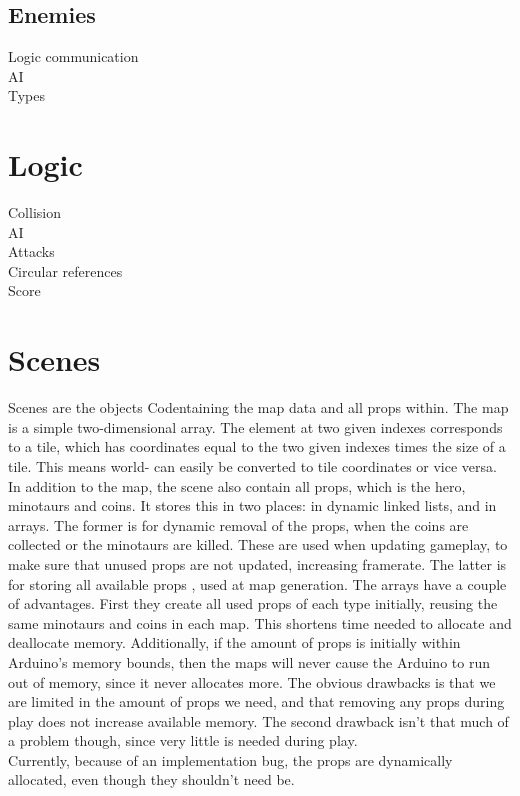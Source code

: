 \subsection{Enemies} Logic communication\\ AI\\ Types

\section{Logic} Collision\\ AI\\ Attacks\\ Circular references\\ Score

\section{Scenes} %
Scenes are the objects Codentaining the map data and
all props within. The map is a simple two-dimensional array. The element at two
given indexes corresponds to a tile, which has coordinates equal to the two
given indexes times the size of a tile. This means world- can easily be
converted to tile coordinates or vice versa.\\ In addition to the map, the
scene also contain all props, which is the hero, minotaurs and coins. It stores
this in two places: in dynamic linked lists, and in arrays. The former is for
dynamic removal of the props, when the coins are collected or the minotaurs are
killed. These are used when updating gameplay, to make sure that unused props
are not updated, increasing framerate. The latter is for storing all available
props , used at map generation. The arrays have a couple of advantages. First
they create all used props of each type initially, reusing the same minotaurs
and coins in each map. This shortens time needed to allocate and deallocate
memory. Additionally, if the amount of props is initially within Arduino's
memory bounds, then the maps will never cause the Arduino to run out of memory,
since it never allocates more. The obvious drawbacks is that we are limited in
the amount of props we need, and that removing any props during play does not
increase available memory. The second drawback isn't that much of a problem
though, since very little is needed during play.\\ Currently, because of an
implementation bug, the props are dynamically allocated, even though they
shouldn't need be.
